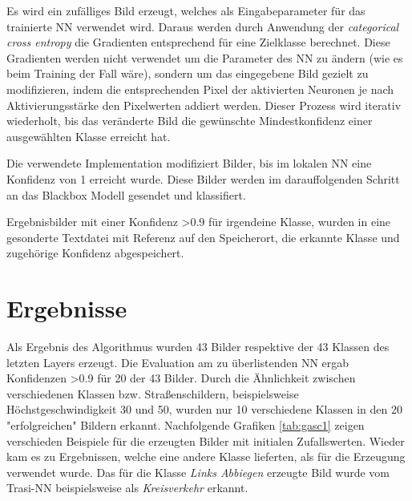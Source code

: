 Es wird ein zufälliges Bild erzeugt, welches als Eingabeparameter für das trainierte NN verwendet wird. 
Daraus werden durch Anwendung der \textit{categorical cross entropy} die Gradienten entsprechend für eine Zielklasse berechnet. Diese Gradienten werden nicht verwendet um die Parameter des NN zu ändern (wie es beim Training der Fall wäre), sondern um das eingegebene Bild gezielt zu modifizieren, indem die entsprechenden Pixel der aktivierten Neuronen je nach Aktivierungsstärke den Pixelwerten addiert werden.
Dieser Prozess wird iterativ wiederholt, bis das veränderte Bild die gewünschte Mindestkonfidenz einer ausgewählten Klasse erreicht hat. 

Die verwendete Implementation modifiziert Bilder, bis im lokalen NN eine Konfidenz von 1 erreicht wurde. Diese Bilder werden im darauffolgenden Schritt an das Blackbox Modell gesendet und klassifiert. 

Ergebnisbilder mit einer Konfidenz >0.9 für irgendeine Klasse, wurden in eine gesonderte Textdatei mit Referenz auf den Speicherort, die erkannte Klasse und zugehörige Konfidenz abgespeichert.

%
%

\section{Ergebnisse}
Als Ergebnis des Algorithmus wurden 43 Bilder respektive der 43 Klassen des letzten Layers erzeugt. Die Evaluation am zu überlistenden NN ergab Konfidenzen >0.9 für 20 der 43 Bilder. Durch die Ähnlichkeit zwischen verschiedenen Klassen bzw. Straßenschildern, beispielsweise Höchstgeschwindigkeit 30 und 50, wurden nur 10 verschiedene Klassen in den 20 "erfolgreichen" Bildern erkannt.
Nachfolgende Grafiken \ref{tab:gasc1} zeigen verschieden Beispiele für die erzeugten Bilder mit initialen Zufallswerten. Wieder kam es zu Ergebnissen, welche eine andere Klasse lieferten, als für die Erzeugung verwendet wurde. Das für die Klasse \textit{Links Abbiegen} erzeugte Bild wurde vom Trasi-NN beispielsweise als \textit{Kreisverkehr} erkannt.

